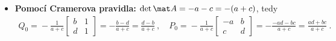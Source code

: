 \begin{example}
\begin{itemize}
        \item \textbf{Pomocí Cramerova pravidla:} $\det \mat A = -a-c = -(a+c)$, tedy
        \begin{align}
            \boxed{ Q_0 =} - \frac{1}{a+c} \begin{bmatrix}
                b & 1\\ d & 1
            \end{bmatrix}
            = - \frac{b-d}{a+c} \boxed{= \frac{d-b}{a+c} }\:, \quad 
            \boxed{ P_0 =} - \frac{1}{a+c} \begin{bmatrix}
               -a & b \\ c & d 
            \end{bmatrix} = - \frac{-ad-bc}{a+c} \boxed{= \frac{ad+bc}{a+c} }\:.
        \end{align}


\end{itemize}
\end{example}

